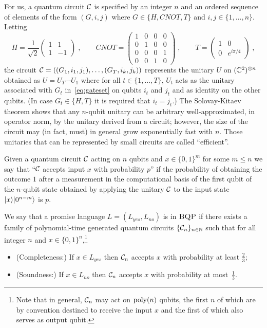 For us, a quantum circuit $\mathcal{C}$ is specified by an integer $n$ and an ordered sequence of elements of the form $(G,i,j)$ where $G \in \{H,CNOT, T\}$ and $i,j\in\{1,\ldots,n\}$. Letting 
\begin{equation}\label{eq:gateset}
 H = \frac{1}{\sqrt{2}} \begin{pmatrix} 1 & 1 \\ 1 & -1 \end{pmatrix}\;,\qquad CNOT = \begin{pmatrix} 1 & 0 & 0 & 0 \\ 0 & 1 & 0 & 0 \\ 0 & 0 & 0 & 1 \\ 0 & 0 & 1 & 0 \end{pmatrix}\;,\qquad T = \begin{pmatrix} 1 & 0 \\ 0 & e^{i\pi/4}\end{pmatrix}\;,
\end{equation}
the circuit $\mathcal{C} = ((G_1,i_1,j_1),\ldots,(G_T,i_k,j_k))$ represents the unitary $U$ on $(\mathbb{C}^2)^{\otimes n}$ obtained as $U = U_T \cdots U_1$ where for all $t\in\{1,\ldots,T\}$, $U_t$ acts as the unitary associated with $G_t$ in~\eqref{eq:gateset} on qubits $i_t$ and $j_t$ and as identity on the other qubits. (In case $G_t\in\{H,T\}$ it is required that $i_t=j_t$.) The Solovay-Kitaev theorem shows that any $n$-qubit unitary can be arbitrary well-approximated, in operator norm, by the unitary derived from a circuit; however, the size of the circuit may (in fact, must) in general grow exponentially fast with $n$. Those unitaries that can be represented by small circuits are called ``efficient''. 

Given a quantum circuit $\mathcal{C}$ acting on $n$ qubits and $x\in\{0,1\}^m$ for some $m\leq n$ we say that ``$\mathcal{C}$ accepts input $x$ with probability $p$'' if the probability of obtaining the outcome $1$ after a measurement in the computational basis of the first qubit of the $n$-qubit state obtained by applying the unitary $\mathcal{C}$ to the input state $|x\rangle|0^{n-m}\rangle$ is $p$.

\begin{definition}
We say that a promise language $L=(L_{yes},L_{no})$ is in $\textsc{BQP}$ if there exists a family of polynomial-time generated quantum circuits $\{\mathcal{C}_n\}_{n\in\mathbb{N}}$ such that for all integer $n$ and $x\in\{0,1\}^n$,\footnote{Note that in general, $\mathcal{C}_n$ may act on $\operatorname{poly}(n)$ qubits, the first $n$ of which are by convention destined to receive the input $x$ and the first of which also serves as output qubit.}
\begin{itemize}
\item (Completeness:) If $x\in L_{yes}$ then $\mathcal{C}_n$ accepts $x$ with probability at least $\frac{2}{3}$;
\item (Soundness:) If $x\in L_{no}$ then $\mathcal{C}_n$ accepts $x$ with probability at most~$\frac{1}{3}$.
\end{itemize}
\end{definition}

